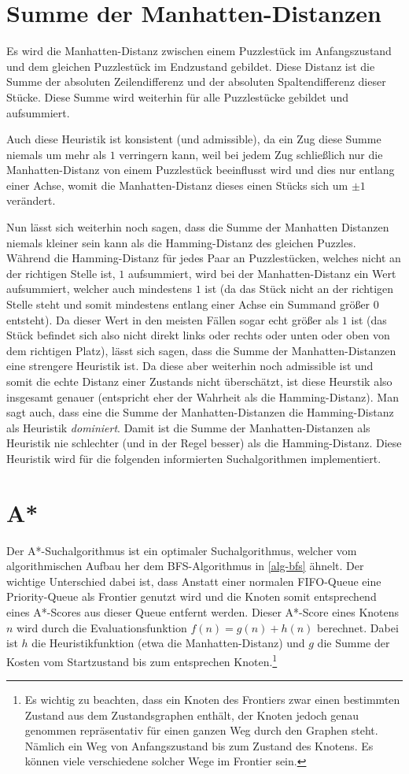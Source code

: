 \documentclass{whswinvcbook}
\begin{document}
\section{Summe der Manhatten-Distanzen}
Es wird die Manhatten-Distanz zwischen einem Puzzlestück im Anfangszustand und dem gleichen Puzzlestück im Endzustand gebildet. Diese Distanz ist die Summe der absoluten Zeilendifferenz und der absoluten Spaltendifferenz dieser Stücke. Diese Summe wird weiterhin für alle Puzzlestücke gebildet und aufsummiert.

Auch diese Heuristik ist konsistent (und admissible), da ein Zug diese Summe niemals um mehr als $1$ verringern kann, weil bei jedem Zug schließlich nur die Manhatten-Distanz von einem Puzzlestück beeinflusst wird und dies nur entlang einer Achse, womit die Manhatten-Distanz dieses einen Stücks sich um $\pm1$ verändert.

Nun lässt sich weiterhin noch sagen, dass die Summe der Manhatten Distanzen niemals kleiner sein kann als die Hamming-Distanz des gleichen Puzzles. Während die Hamming-Distanz für jedes Paar an Puzzlestücken, welches nicht an der richtigen Stelle ist, $1$ aufsummiert, wird bei der Manhatten-Distanz ein Wert aufsummiert, welcher auch mindestens $1$ ist (da das Stück nicht an der richtigen Stelle steht und somit mindestens entlang einer Achse ein Summand größer $0$ entsteht). Da dieser Wert in den meisten Fällen sogar echt größer als $1$ ist (das Stück befindet sich also nicht direkt links oder rechts oder unten oder oben von dem richtigen Platz), lässt sich sagen, dass die Summe der Manhatten-Distanzen eine strengere Heuristik ist. Da diese aber weiterhin noch admissible ist und somit die echte Distanz einer Zustands nicht überschätzt, ist diese Heurstik also insgesamt genauer (entspricht eher der Wahrheit als die Hamming-Distanz). Man sagt auch, dass eine die Summe der Manhatten-Distanzen die Hamming-Distanz als Heuristik \textit{dominiert}. Damit ist die Summe der Manhatten-Distanzen als Heuristik nie schlechter (und in der Regel besser) als die Hamming-Distanz. Diese Heuristik wird für die folgenden informierten Suchalgorithmen implementiert.
\section{A*}
Der A*-Suchalgorithmus ist ein optimaler Suchalgorithmus, welcher vom algorithmischen Aufbau her dem BFS-Algorithmus in \ref{alg-bfs} ähnelt. Der wichtige Unterschied dabei ist, dass Anstatt einer normalen FIFO-Queue eine Priority-Queue als Frontier genutzt wird und die Knoten somit entsprechend eines A*-Scores aus dieser Queue entfernt werden. Dieser A*-Score eines Knotens $n$ wird durch die Evaluationsfunktion $f(n)=g(n)+h(n)$ berechnet. Dabei ist $h$ die Heuristikfunktion (etwa die Manhatten-Distanz) und $g$ die Summe der Kosten vom Startzustand bis zum entsprechen Knoten.\footnote{Es wichtig zu beachten, dass ein Knoten des Frontiers zwar einen bestimmten Zustand aus dem Zustandsgraphen enthält, der Knoten jedoch genau genommen repräsentativ für einen ganzen Weg durch den Graphen steht. Nämlich ein Weg von Anfangszustand bis zum Zustand des Knotens. Es können viele verschiedene solcher Wege im Frontier sein.}
\end{document}
